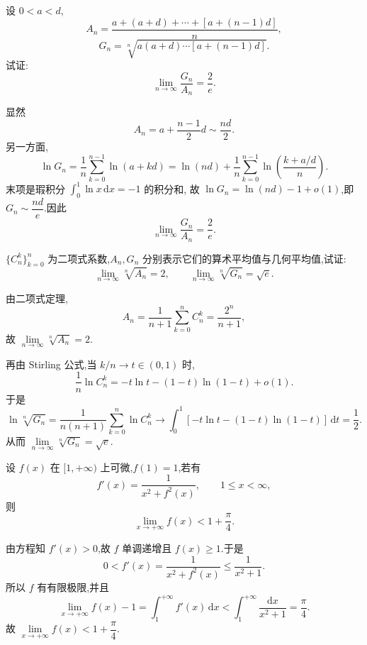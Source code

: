 \begin{example}
  设 $0<a<d$,
  \[
    A_n=\dfrac{a+(a+d)+\cdots+[a+(n-1)d]}{n},
  \]
  \[
    G_n=\sqrt[n]{a(a+d)\cdots[a+(n-1)d]}.
  \]
  试证:
  \[
    \lim\limits_{n\to\infty}\dfrac{G_n}{A_n}=\dfrac{2}{e}.
  \]
\end{example}
\exampleblank

\begin{solution}
  显然
  \[
    A_n=a+\dfrac{n-1}{2}d\sim\dfrac{nd}{2}.
  \]
  另一方面,
  \[
    \ln G_n=\dfrac{1}{n}\sum\limits_{k=0}^{n-1}\ln(a+kd)
    =\ln(nd)+\dfrac{1}{n}\sum\limits_{k=0}^{n-1}
    \ln\left(\dfrac{k+a/d}{n}\right).
  \]
  末项是瑕积分 $\displaystyle\int_0^1\ln x\,\mathrm{d}x=-1$ 的积分和,
  故 $\ln G_n=\ln(nd)-1+o(1)$,即 $G_n\sim\dfrac{nd}{e}$.因此
  \[
    \lim\limits_{n\to\infty}\dfrac{G_n}{A_n}=\dfrac{2}{e}.
  \]
\end{solution}

\begin{example}
  $\{C_{n}^{k}\}_{k=0}^n$ 为二项式系数,$A_n,G_n$ 分别表示它们的算术平均值与几何平均值,试证:
  \[
    \lim\limits_{n\to\infty}\sqrt[n]{A_n}=2,
    \qquad
    \lim\limits_{n\to\infty}\sqrt[n]{G_n}=\sqrt{e}.
  \]
\end{example}
\exampleblank

\begin{solution}
  由二项式定理,
  \[
    A_n=\dfrac{1}{n+1}\sum\limits_{k=0}^nC_n^k=\dfrac{2^n}{n+1},
  \]
  故 $\displaystyle\lim\limits_{n\to\infty}\sqrt[n]{A_n}=2$.

  再由 Stirling 公式,当 $k/n\to t\in(0,1)$ 时,
  \[
    \dfrac{1}{n}\ln C_n^k
    =-t\ln t-(1-t)\ln(1-t)+o(1).
  \]
  于是
  \[
    \ln\sqrt[n]{G_n}
    =\dfrac{1}{n(n+1)}\sum\limits_{k=0}^n\ln C_n^k
    \longrightarrow\int_0^1[-t\ln t-(1-t)\ln(1-t)]\,\mathrm{d}t
    =\dfrac{1}{2}.
  \]
  从而 $\displaystyle\lim\limits_{n\to\infty}\sqrt[n]{G_n}=\sqrt e$.
\end{solution}

\begin{example}
  设 $f(x)$ 在 $\lbrack 1,+\infty)$ 上可微,$f(1)=1$,若有
  \[
    f'(x)=\dfrac{1}{x^2+f^2(x)},
    \qquad 1\leq x<\infty,
  \]
  则
  \[
    \lim\limits_{x\to+\infty}f(x)<1+\dfrac{\pi}{4}.
  \]
\end{example}
\exampleblank

\begin{solution}
  由方程知 $f'(x)>0$,故 $f$ 单调递增且 $f(x)\geq1$.于是
  \[
    0<f'(x)=\dfrac{1}{x^2+f^2(x)}\leq\dfrac{1}{x^2+1}.
  \]
  所以 $f$ 有有限极限,并且
  \[
    \lim\limits_{x\to+\infty}f(x)-1
    =\int_1^{+\infty}f'(x)\,\mathrm{d}x
    <\int_1^{+\infty}\dfrac{\mathrm{d}x}{x^2+1}
    =\dfrac{\pi}{4}.
  \]
  故 $\displaystyle\lim\limits_{x\to+\infty}f(x)<1+\dfrac{\pi}{4}$.
\end{solution}



